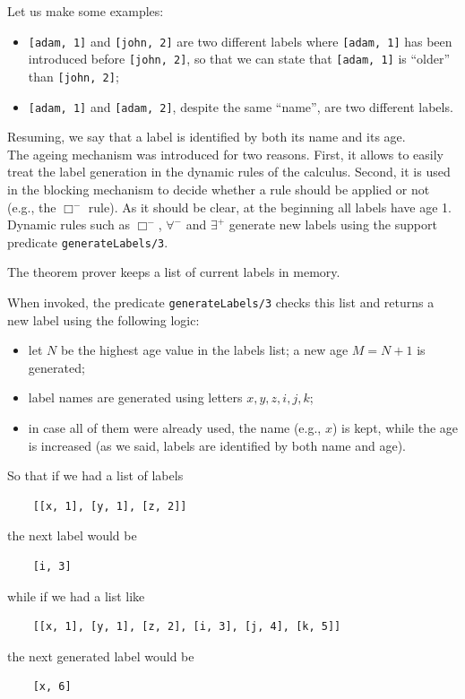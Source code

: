 \documentclass[a4paper, 11pt, oneside]{elsarticle}
\newcommand{\perogni} {\forall}
\newcommand{\esiste} {\exists}
\begin{document}
Let us make some examples:
\begin{itemize}
\item \texttt{[adam, 1]} and \texttt{[john, 2]} are two different labels where \texttt{[adam, 1]} has been introduced before \texttt{[john, 2]}, so that we can state that \texttt{[adam, 1]} is ``older'' than \texttt{[john, 2]};

\item \texttt{[adam, 1]} and \texttt{[adam, 2]}, despite the same ``name'', are two different labels.
\end{itemize}
Resuming, we say that a label is identified by both its name and its age.\\

The ageing mechanism was introduced for two reasons.
First, it allows to easily treat the label generation in the dynamic rules of the calculus.
Second, it is used in the blocking mechanism to decide whether a rule should be applied or not (e.g., the $\Box^-$ rule).
As it should be clear, at the beginning all labels have age 1. Dynamic rules such as $\Box^-$, $\perogni^-$ and $\esiste^+$ generate new labels using the support predicate \texttt{generateLabels/3}.

The theorem prover keeps a list of current labels in memory.

When invoked, the predicate \texttt{generateLabels/3} checks this list and returns a new label using the following logic:
\begin{itemize}
\item let $N$ be the highest age value in the labels list; a new age $M = N + 1$ is generated;
\item label names are generated using letters $x,y,z,i,j,k$;
\item in case all of them were already used, the name (e.g., $x$) is kept, while the age is increased (as we said, labels are identified by both name and age).
\end{itemize}
So that if we had a list of labels
\begin{verbatim}
    [[x, 1], [y, 1], [z, 2]]
\end{verbatim}
the next label would be
\begin{verbatim}
    [i, 3]
\end{verbatim}
while if we had a list like
\begin{verbatim}
    [[x, 1], [y, 1], [z, 2], [i, 3], [j, 4], [k, 5]]
\end{verbatim}
the next generated label would be
\begin{verbatim}
    [x, 6]
\end{verbatim}
\end{document}
